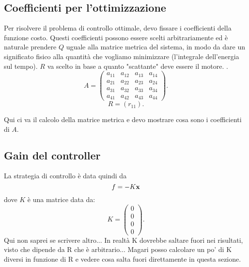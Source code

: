 \subsection{Coefficienti per l'ottimizzazione}
Per risolvere il problema di controllo ottimale, devo fissare i coefficienti della funzione costo. 
Questi coefficienti possono essere scelti arbitrariamente ed è naturale prendere $Q$ uguale alla matrice metrica del sistema, in modo da dare un significato fisico alla quantità che vogliamo minimizzare (l'integrale dell'energia sul tempo). $R$ va scelto in base a quanto "scattante" deve essere il motore. .
\begin{equation*}
    A = \left(
    \begin{array}{cccc}
        a_{11} & a_{12} & a_{13} & a_{14} \\
        a_{21} & a_{22} & a_{23} & a_{24} \\
        a_{31} & a_{32} & a_{33} & a_{34} \\
        a_{41} & a_{42} & a_{43} & a_{44}
    \end{array}
    \right).
\end{equation*}
\begin{equation*}
    R = \left(
    r_{11}
    \right).
\end{equation*}

Qui ci va il calcolo della matrice metrica e devo mostrare cosa sono i coefficienti di $A$.


\subsection{Gain del controller}
La strategia di controllo è data quindi da
\begin{equation*}
    f = -K\mathbf{x}
\end{equation*}
dove $K$ è una matrice data da:
\begin{equation*}
    K = \left(
    \begin{array}{c}
         0 \\
         0 \\
         0 \\
         0
    \end{array}
    \right).
\end{equation*}
Qui non saprei se scrivere altro... In realtà K dovrebbe saltare fuori nei risultati, visto che dipende da R che è arbitrario... Magari posso calcolare un po' di K diversi in funzione di R e vedere cosa salta fuori direttamente in questa sezione.



